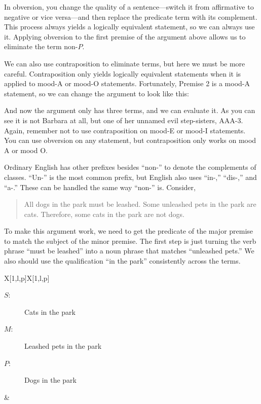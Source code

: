 In obversion, you change the quality of a sentence---switch it from affirmative to negative or vice versa---and then replace the predicate term with its complement. This process always yields a logically equivalent statement, so we can always use it. Applying obversion to the first premise of the argument above allows us to eliminate the term non-$P$.

\begin{kormanize}
\end{kormanize}

We can also use contraposition to eliminate terms, but here we must be more careful. Contraposition only yields logically equivalent statements when it is applied to mood-A or mood-O statements. Fortunately, Premise 2 is a mood-A statement, so we can change the argument to look like this:

\begin{kormanize}
\end{kormanize}

And now the argument only has three terms, and we can evaluate it. As you can see it is not Barbara at all, but one of her unnamed evil step-sisters, AAA-3. Again, remember not to use contraposition on mood-E or mood-I statements. You can use obversion on any statement, but contraposition only works on mood A or mood O.

Ordinary English has other prefixes besides ``non-'' to denote the complements of classes. ``Un-'' is the most common prefix, but English also uses ``in-,'' ``dis-,'' and ``a-.'' These can be handled the same way ``non-'' is. Consider,

\begin{quotation}
All dogs in the park must be leashed. Some unleashed pets in the park are cats. Therefore, some cats in the park are not dogs.
\end{quotation}

To make this argument work, we need to get the predicate of the major premise to match the subject of the minor premise. The first step is just turning the verb phrase ``must be leashed'' into a noun phrase that matches ``unleashed pets.'' We also should use the qualification ``in the park'' consistently across the terms.

\begin{tabu}{{X[1,l,p]X[1,l,p]}}

\begin{description}
\item[$S$:] Cats in the park
\item[$M$:] Leashed pets in the park
\item[$P$:] Dogs in the park
\end{description}

&

\begin{kormanize}
\end{kormanize}

\end{tabu}

